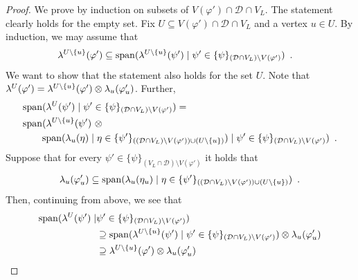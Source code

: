 \documentclass{theoretics}
\newcommand{\set}[1]{\{ #1 \}}
\newcommand{\eqperiod}{\enspace .}
\newcommand{\V}[1][]{V_{#1}}
\newcommand{\Vl}{\V[L]}
\newcommand{\linmap}[1][]{\ensuremath \lambda_{{#1}}}
\newcommand{\linmapof}[2][]{\linmap[#1](#2)}
\newcommand{\linmapl}[2][]{\ensuremath \lambda^{{#2}}_{{#1}}}
\newcommand{\linmaplof}[3][]{\linmapl[#1]{#2}(#3)}
\newcommand{\diffclosure}[1][]{D_{{#1}}}
\renewcommand{\diffclosure}[1][]{\mathcal{D}_{{#1}}}
\newcommand{\matchb}{\varphi'}
\newcommand{\matchc}{\psi}
\newcommand{\matchd}{\psi'}
\newcommand{\matche}{\eta}
\newcommand{\spans}[1]{\mathrm{span} ( #1 )}
\newcommand{\tensor}{\ensuremath \otimes}
\numberwithin{equation}{section}
\begin{document}
\begin{proof}
  We prove  by induction on subsets of
  $V(\matchb) \cap \diffclosure \cap \Vl$. The statement clearly holds
  for the empty set. 
  Fix $U \subseteq V(\matchb) \cap \diffclosure \cap \Vl$ and a vertex
  $u \in U$. By induction, we may assume that
  \begin{align}\label{eq:ih}
    \linmaplof{U \setminus \set{u}}{\matchb}
    &\subseteq
      \spans{
      \linmaplof{U
      \setminus \set{u}}
      {\matchd} \mid \matchd \in 
      \set{\matchc}_{(\diffclosure \cap \Vl) \setminus V(\matchb)}} 
      \eqperiod
  \end{align}
  We want to show that the statement also holds for the set $U$.
  Note that 
    $\linmaplof{U}{\matchb} 
    = 
    \linmaplof{U \setminus \set{u}}{\matchb} \tensor 
    \linmapof[u]{\matchb_u}$. Further,
  \begin{align}
    &\spans{\linmaplof{U}{\matchd}
      \mid \matchd \in \set{\matchc}_{(\diffclosure \cap \Vl)
      \setminus V(\matchb)}
      } =\\
    &\spans{\linmaplof{U \setminus \set{u}}{\matchd} ~\tensor
      \nonumber\\
    &\qquad
    \spans{\linmapof[u]{\matche} \mid \matche \in
      \set{\matchd}_{((\diffclosure \cap \Vl) \setminus
    V(\matchb)) \cup (U \setminus \set{u})}}
      \mid \matchd \in \set{\matchc}_{(\diffclosure \cap \Vl)
      \setminus V(\matchb)}
      } \eqperiod
  \end{align}
  Suppose that for every $\matchd \in \set{\matchc}_{(\Vl \cap \diffclosure)
      \setminus V(\matchb)}$ it holds that
  \begin{align}\label{eq:linspace_u_spanned}
    \linmapof[u]{\matchb_u} \subseteq \spans{\linmapof[u]{\matche_u} 
    \mid \matche \in \set{\matchd}
    _{((\diffclosure \cap \Vl) \setminus V(\matchb))\cup (U \setminus
    \set{u})}}
    \eqperiod
  \end{align}
  Then, continuing from above, we see that
  \begin{align}
    \spans{\linmaplof{U}{\matchd}
      \mid &\matchd \in \set{\matchc}_{(\diffclosure \cap \Vl)
      \setminus V(\matchb)}
      } \\
    &\supseteq
      \spans{\linmaplof{U \setminus \set{u}}{\matchd}
      \mid \matchd \in \set{\matchc}_{(\diffclosure \cap \Vl)
      \setminus V(\matchb)}
      }
      \tensor \linmapof[u]{\matchb_u}\\
    &\supseteq
      \linmaplof{U \setminus \set{u}}{\matchb} \tensor 
      \linmapof[u]{\matchb_u}\\

\end{align}
\end{proof}
\end{document}
